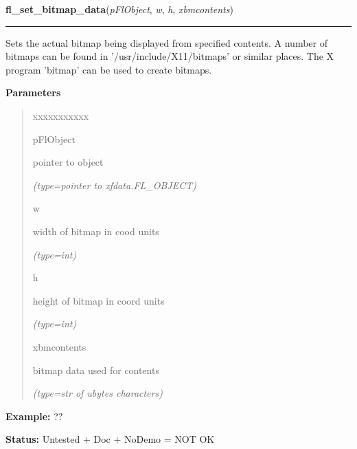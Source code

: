 \hspace{.8\funcindent}\begin{boxedminipage}{\funcwidth}

    \raggedright \textbf{fl\_set\_bitmap\_data}(\textit{pFlObject}, \textit{w}, \textit{h}, \textit{xbmcontents})

    \vspace{-1.5ex}

    \rule{\textwidth}{0.5\fboxrule}
\setlength{\parskip}{2ex}
    Sets the actual bitmap being displayed from specified contents. A 
    number of bitmaps can be found in '/usr/include/X11/bitmaps' or similar
    places. The X program 'bitmap' can be used to create bitmaps.

\setlength{\parskip}{1ex}
      \textbf{Parameters}
      \vspace{-1ex}

      \begin{quote}
        \begin{Ventry}{xxxxxxxxxxx}

          \item[pFlObject]

          pointer to object

            {\it (type=pointer to xfdata.FL\_OBJECT)}

          \item[w]

          width of bitmap in cood units

            {\it (type=int)}

          \item[h]

          height of bitmap in coord units

            {\it (type=int)}

          \item[xbmcontents]

          bitmap data used for contents

            {\it (type=str of ubytes characters)}

        \end{Ventry}

      \end{quote}

\textbf{Example:} ??



\textbf{Status:} Untested + Doc + NoDemo = NOT OK



    \end{boxedminipage}


